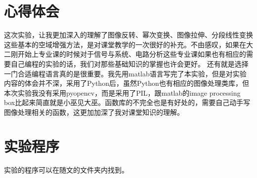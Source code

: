 \documentclass[]{IEEEphot}
\begin{document}
\section{心得体会}
这次实验，让我更加深入的理解了图像反转、幂次变换、图像拉伸、分段线性变换这些基本的空域增强方法，是对课堂教学的一次很好的补充。不由感叹，如果在大二刚开始上专业课的时候对于信号与系统、电路分析这些专业课如果也有相应的需要自己编程的实验的话，我们对那些基础知识的掌握也许会更好。
还有就是选择一门合适编程语言真的是很重要。我先用matlab语言写完了本实验，但是对实验内容的体会并不深，采用了Python后，虽然Python也有相应的图像处理类库，但本次实验我没有采用pyopencv，而是采用了PIL，跟matlab的image processing box比起来简直就是小巫见大巫。函数库的不完全也是有好处的，需要自己动手写图像处理相关的函数，这更加加深了我对课堂知识的理解。
\section{实验程序}
实验的程序可以在随文的文件夹内找到。
\end{document}
